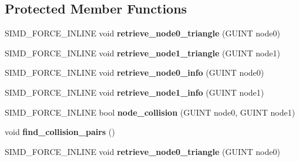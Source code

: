 \subsection*{Protected Member Functions}
\begin{DoxyCompactItemize}
\item 
\mbox{\label{classGIM__TREE__TREE__COLLIDER_a1a48ca83a2a79ab747bfc64211a83f41}} 
S\+I\+M\+D\+\_\+\+F\+O\+R\+C\+E\+\_\+\+I\+N\+L\+I\+NE void {\bfseries retrieve\+\_\+node0\+\_\+triangle} (G\+U\+I\+NT node0)
\item 
\mbox{\label{classGIM__TREE__TREE__COLLIDER_a1d6f27f439686db84f925db43ec9bae6}} 
S\+I\+M\+D\+\_\+\+F\+O\+R\+C\+E\+\_\+\+I\+N\+L\+I\+NE void {\bfseries retrieve\+\_\+node1\+\_\+triangle} (G\+U\+I\+NT node1)
\item 
\mbox{\label{classGIM__TREE__TREE__COLLIDER_a59ceb8b0c49c0b5ef0d8a967f166c15c}} 
S\+I\+M\+D\+\_\+\+F\+O\+R\+C\+E\+\_\+\+I\+N\+L\+I\+NE void {\bfseries retrieve\+\_\+node0\+\_\+info} (G\+U\+I\+NT node0)
\item 
\mbox{\label{classGIM__TREE__TREE__COLLIDER_aa516f21e2bb2fb59112700ee3fac660f}} 
S\+I\+M\+D\+\_\+\+F\+O\+R\+C\+E\+\_\+\+I\+N\+L\+I\+NE void {\bfseries retrieve\+\_\+node1\+\_\+info} (G\+U\+I\+NT node1)
\item 
\mbox{\label{classGIM__TREE__TREE__COLLIDER_a7c4233b51e834c5ccbdd22f5dd7ff55d}} 
S\+I\+M\+D\+\_\+\+F\+O\+R\+C\+E\+\_\+\+I\+N\+L\+I\+NE bool {\bfseries node\+\_\+collision} (G\+U\+I\+NT node0, G\+U\+I\+NT node1)
\item 
\mbox{\label{classGIM__TREE__TREE__COLLIDER_a7567c0cde6b2271a48661bfe7c5b162d}} 
void {\bfseries find\+\_\+collision\+\_\+pairs} ()
\item 
\mbox{\label{classGIM__TREE__TREE__COLLIDER_a1a48ca83a2a79ab747bfc64211a83f41}} 
S\+I\+M\+D\+\_\+\+F\+O\+R\+C\+E\+\_\+\+I\+N\+L\+I\+NE void {\bfseries retrieve\+\_\+node0\+\_\+triangle} (G\+U\+I\+NT node0)
\item 
\mbox{\label{classGIM__TREE__TREE__COLLIDER_a1d6f27f439686db84f925db43ec9bae6}} 

\end{DoxyCompactItemize}
